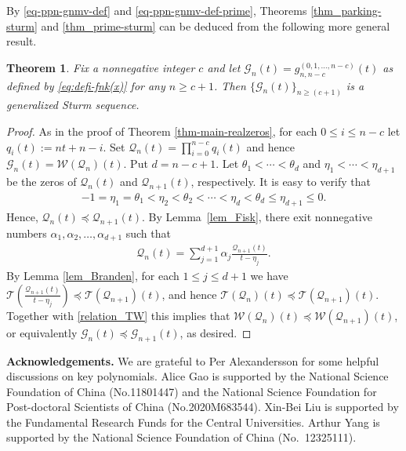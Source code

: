 \documentclass[12pt]{article}
\newtheorem{thm}{Theorem}[section]
\numberwithin{equation}{section}
\begin{document}
By \eqref{eq-ppn-gnmv-def} and \eqref{eq-ppn-gnmv-def-prime}, Theorems \ref{thm_parking-sturm} and \ref{thm_prime-sturm} can be deduced from the following more general result. 

\begin{thm}\label{thm_gc}
Fix a nonnegative integer $c$ and let $\mathcal{G}_n(t)=g^{(0,1,\ldots,n-c)}_{n,n-c}(t)$ as defined by \eqref{eq:defi-fnk(x)} for any $n\geq c+1$. 
Then $\{\mathcal{G}_n(t)\}_{n\ge (c+1)}$ is a generalized Sturm sequence.
\end{thm}

\begin{proof}
As in the proof of Theorem \ref{thm-main-realzeros}, for each $0\le i\le n-c$ let $q_i(t):=nt+n-i$. Set $\mathcal{Q}_n(t)=\prod_{i=0}^{n-c}q_i(t)$ and hence
$\mathcal{G}_n(t)=\mathcal W\left(\mathcal{Q}_n\right)(t)$.
Put $d=n-c+1$. Let $\theta_1<\cdots<\theta_{d}$ and $\eta_1<\cdots<\eta_{d+1}$ be the zeros of  $\mathcal{Q}_n(t)$ and $\mathcal{Q}_{n+1}(t)$, respectively. 
It is easy to verify that 
\begin{align*}
-1=\eta_1=\theta_1<\eta_2<\theta_2<\cdots<\eta_{d}<\theta_{d}\leq\eta_{d+1}\le 0.
\end{align*}
Hence, $\mathcal{Q}_n(t)\preceq \mathcal{Q}_{n+1}(t)$.
By Lemma~\ref{lem_Fisk}, there exit nonnegative numbers $\alpha_1,\alpha_2,\ldots,\alpha_{d+1}$ such that
\begin{align}\label{eq_pc}
\mathcal{Q}_n(t)=\sum_{j=1}^{d+1}\alpha_j\frac{\mathcal{Q}_{n+1}(t)}{t-\eta_j}.
\end{align}
By Lemma \ref{lem_Branden}, for each $1\leq j\leq d+1$ we have 
$\mathcal{T}\left(\frac{\mathcal{Q}_{n+1}(t)}{t-\eta_j}\right)\preceq \mathcal{T}(\mathcal{Q}_{n+1})(t)$, and hence $\mathcal{T}(\mathcal{Q}_{n})(t)\preceq \mathcal{T}(\mathcal{Q}_{n+1})(t)$.
Together with \eqref{relation_TW} this implies that $\mathcal{W}(\mathcal{Q}_{n})(t)\preceq \mathcal{W}(\mathcal{Q}_{n+1})(t)$, or equivalently $\mathcal{G}_n(t)\preceq \mathcal{G}_{n+1}(t)$, as desired.
\end{proof}

\noindent \textbf{Acknowledgements.} 
We are grateful to Per Alexandersson for some helpful discussions on key polynomials. 
Alice Gao is supported by the National Science Foundation of China (No.11801447) and the National Science Foundation for Post-doctoral Scientists
of China (No.2020M683544). 
Xin-Bei Liu is supported by the Fundamental Research Funds for the Central Universities.
Arthur Yang is supported by the National Science Foundation of China (No.\ 12325111). 
\end{document}
